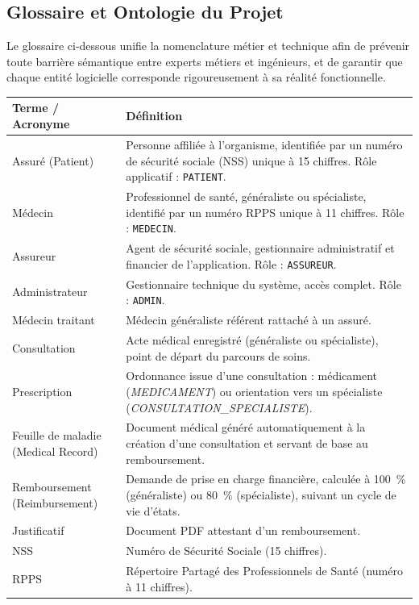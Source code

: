 \documentclass[11pt,a4paper]{article}
\begin{document}
\subsection{Glossaire et Ontologie du Projet}

Le glossaire ci-dessous unifie la nomenclature métier et technique afin de
prévenir toute barrière sémantique entre experts métiers et ingénieurs, et de
garantir que chaque entité logicielle corresponde rigoureusement à sa réalité
fonctionnelle.

\begin{center}
\begin{longtable}{|L{3.4cm}|L{11.0cm}|}
\hline
{}\textbf{Terme / Acronyme} & \textbf{Définition}\\\hline
\endhead
Assuré (Patient) & Personne affiliée à l'organisme, identifiée par un numéro de
sécurité sociale (NSS) unique à 15 chiffres. Rôle applicatif : \texttt{PATIENT}.\\\hline
Médecin & Professionnel de santé, généraliste ou spécialiste, identifié par un
numéro RPPS unique à 11 chiffres. Rôle : \texttt{MEDECIN}.\\\hline
Assureur & Agent de sécurité sociale, gestionnaire administratif et financier de
l'application. Rôle : \texttt{ASSUREUR}.\\\hline
Administrateur & Gestionnaire technique du système, accès complet. Rôle : \texttt{ADMIN}.\\\hline
Médecin traitant & Médecin généraliste référent rattaché à un assuré.\\\hline
Consultation & Acte médical enregistré (généraliste ou spécialiste), point de
départ du parcours de soins.\\\hline
Prescription & Ordonnance issue d'une consultation : médicament (\emph{MEDICAMENT})
ou orientation vers un spécialiste (\emph{CONSULTATION\_SPECIALISTE}).\\\hline
Feuille de maladie (Medical Record) & Document médical généré automatiquement à la
création d'une consultation et servant de base au remboursement.\\\hline
Remboursement (Reimbursement) & Demande de prise en charge financière, calculée à
100~\% (généraliste) ou 80~\% (spécialiste), suivant un cycle de vie d'états.\\\hline
Justificatif & Document PDF attestant d'un remboursement.\\\hline
NSS & Numéro de Sécurité Sociale (15 chiffres).\\\hline
RPPS & Répertoire Partagé des Professionnels de Santé (numéro à 11 chiffres).\\\hline

\end{longtable}
\end{center}
\end{document}
